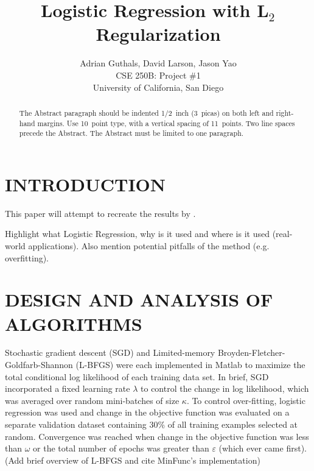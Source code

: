 
\title{Logistic Regression with L$_2$ Regularization}

\author{Adrian Guthals, David Larson, Jason Yao \\
CSE 250B: Project \#1 \\
University of California, San Diego \\
}




\maketitle


\begin{abstract}
The Abstract paragraph should be indented 1/2~inch (3~picas) on
both left and right-hand margins. Use 10~point type, with a
vertical spacing of 11~points. Two line spaces precede the Abstract.
The Abstract must be limited to one paragraph.
\end{abstract}





\section{INTRODUCTION}
\label{sec:intro}

This paper will attempt to recreate the results by \cite{t-logistic}.

Highlight what Logistic Regression, why is it used and where is it used (real-world applications). Also mention potential pitfalls of the method (e.g. overfitting).


\section{DESIGN AND ANALYSIS OF ALGORITHMS}
\label{sec:algorithms}

Stochastic gradient descent (SGD) and Limited-memory Broyden-Fletcher-Goldfarb-Shannon (L-BFGS) were each implemented in Matlab to maximize the total conditional log likelihood of each training data set. In brief, SGD incorporated a fixed learning rate $\lambda$ to control the change in log likelihood, which was averaged over random mini-batches of size $\kappa$. To control over-fitting, logistic regression was used and change in the objective function was evaluated on a separate validation dataset containing 30\% of all training examples selected at random. Convergence was reached when change in the objective function was less than $\omega$ or the total number of epochs was greater than $\varepsilon$ (which ever came first). (Add brief overview of L-BFGS and cite MinFunc's implementation)

